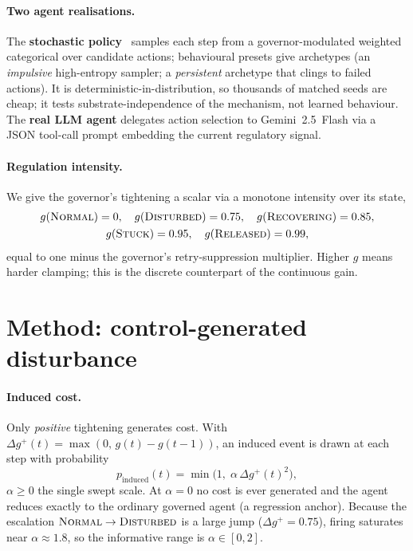 \documentclass[11pt]{article}
\begin{document}
\paragraph{Two agent realisations.}
The \textbf{stochastic policy}~\cite{sutton2018rl} samples each step from a governor-modulated
weighted categorical over candidate actions; behavioural presets give
archetypes (an \emph{impulsive} high-entropy sampler; a \emph{persistent}
archetype that clings to failed actions). It is deterministic-in-distribution,
so thousands of matched seeds are cheap; it tests substrate-independence of the
mechanism, not learned behaviour. The \textbf{real LLM agent} delegates action
selection to Gemini~2.5~Flash via a JSON tool-call prompt embedding the current
regulatory signal.

\paragraph{Regulation intensity.}
We give the governor's tightening a scalar via a monotone intensity over its
state,
\begin{equation}
\begin{gathered}
g(\textsc{Normal})=0,\quad
g(\textsc{Disturbed})=0.75,\quad
g(\textsc{Recovering})=0.85,\\
g(\textsc{Stuck})=0.95,\quad
g(\textsc{Released})=0.99,
\end{gathered}
\label{eq:intensity}
\end{equation}
equal to one minus the governor's retry-suppression multiplier. Higher $g$
means harder clamping; this is the discrete counterpart of the continuous gain.

\section{Method: control-generated disturbance}
\label{sec:method}

\paragraph{Induced cost.}
Only \emph{positive} tightening generates cost. With
$\Delta g^{+}(t)=\max(0,\,g(t)-g(t-1))$, an induced event is drawn at each step
with probability
\begin{equation}
p_{\mathrm{induced}}(t)=\min\!\big(1,\;\alpha\,\Delta g^{+}(t)^2\big),
\label{eq:pinduced}
\end{equation}
$\alpha\ge0$ the single swept scale. At $\alpha=0$ no cost is ever generated
and the agent reduces exactly to the ordinary governed agent (a regression
anchor). Because the escalation $\textsc{Normal}\to\textsc{Disturbed}$ is a
large jump ($\Delta g^{+}=0.75$), firing saturates near $\alpha\approx1.8$, so
the informative range is $\alpha\in[0,2]$.
\end{document}
